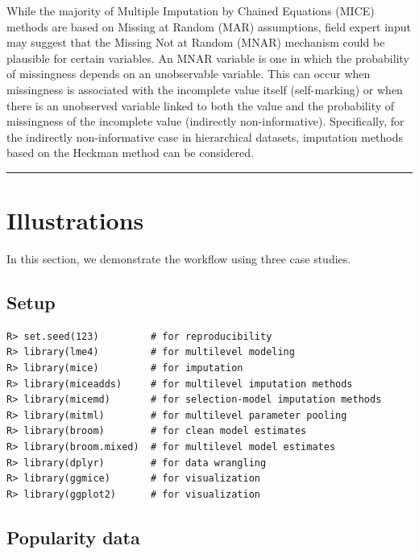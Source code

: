 \documentclass[
  article]{jss}
\begin{document}
While the majority of Multiple Imputation by Chained Equations (MICE)
methods are based on Missing at Random (MAR) assumptions, field expert
input may suggest that the Missing Not at Random (MNAR) mechanism could
be plausible for certain variables. An MNAR variable is one in which the
probability of missingness depends on an unobservable variable. This can
occur when missingness is associated with the incomplete value itself
(self-marking) or when there is an unobserved variable linked to both
the value and the probability of missingness of the incomplete value
(indirectly non-informative). Specifically, for the indirectly
non-informative case in hierarchical datasets, imputation methods based
on the Heckman method can be
considered.\cite{hammon2020,hammon2022,munoz2023}

\begin{center}\rule{0.5\linewidth}{0.5pt}\end{center}

\hypertarget{sec-illustrations}{%
\section{Illustrations}\label{sec-illustrations}}

In this section, we demonstrate the workflow using three case studies.

\hypertarget{setup}{%
\subsection{Setup}\label{setup}}

\begin{verbatim}
R> set.seed(123)         # for reproducibility
R> library(lme4)         # for multilevel modeling
R> library(mice)         # for imputation
R> library(miceadds)     # for multilevel imputation methods
R> library(micemd)       # for selection-model imputation methods
R> library(mitml)        # for multilevel parameter pooling
R> library(broom)        # for clean model estimates
R> library(broom.mixed)  # for multilevel model estimates
R> library(dplyr)        # for data wrangling
R> library(ggmice)       # for visualization
R> library(ggplot2)      # for visualization
\end{verbatim}

\hypertarget{popularity-data}{%
\subsection{Popularity data}\label{popularity-data}}
\end{document}
